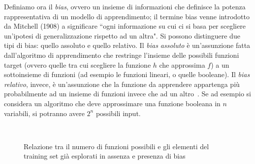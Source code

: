 \documentclass[oneside, openany]{book}
\begin{document}
		Definiamo ora il \textit{bias}, ovvero un insieme di informazioni che definisce la potenza rappresentativa di un modello di apprendimento; il termine bias venne introdotto da Mitchell (1908) a significare ``ogni informazione su cui ci si basa per scegliere un'ipotesi di generalizzazione rispetto ad un altra". Si possono distinguere due tipi di bias: quello assoluto e quello relativo. Il \textit{bias assoluto} è un'assunzione fatta dall'algoritmo di apprendimento che restringe l'insieme delle possibili funzioni target (ovvero quelle tra cui scegliere la funzione $h$ che approssima $f$) a un sottoinsieme di funzioni (ad esempio le funzioni lineari, o quelle booleane).
		Il \textit{bias relativo}, invece, è un'assunzione che la funzione da apprendere appartenga più probabilmente ad un insieme di funzioni invece che ad un altro~\cite{bib:bias}.
		Se ad esempio si considera un algoritmo che deve approssimare una funzione booleana in $n$ variabili, si potranno avere $2^n$ possibili input. 
		\begin{figure}[h]
			\centering
			 \quad
			 \\
			\caption{Relazione tra il numero di funzioni possibili e gli elementi del training set già esplorati in assenza e presenza di bias}
			\label{fig:bias}
			
		\end{figure}
\end{document}
